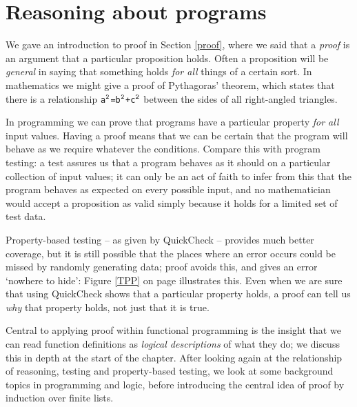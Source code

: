 
\chapter{Reasoning about programs}
\chapstart
\label{reasoningProgs}


We gave an introduction to proof in Section \ref{proof}, where we said
that a \emph{proof} is an argument that a particular proposition
holds. Often
a proposition will be \emph{general} in saying that something holds
\emph{for all} 
things of a certain sort. In mathematics we might give a proof of Pythagoras'
theorem, which states that there is a relationship {\tt a$^{\tt 2}$=b$^{\tt
2}$+c$^{\tt 2}$} between the sides of all right-angled triangles. 

In programming we can prove that programs have
a particular property \emph{for all} input values. Having a proof
means that we can be certain that the program will behave as we require
whatever the conditions. Compare this with program testing: a test
assures us that a program behaves as it should on a particular collection of input
values; it can only be an act of faith to infer from this that the program behaves as
expected on every possible input, and no mathematician would accept a proposition
as valid simply because it holds for a limited set of test data. 


Property-based testing -- as given by QuickCheck -- provides much better coverage, but it is still possible that the places where an error occurs could be missed by randomly generating data; proof avoids this, and gives an error `nowhere to hide': Figure \ref{TPP} on page \pageref{TPP} illustrates this. Even when we are sure that using QuickCheck shows that a particular property holds, a proof can tell us \emph{why} that property holds, not just that it is true.

Central to applying proof within functional programming is
the insight that we can read function definitions as \emph{logical
descriptions} of what they do; we discuss this in depth at the
start of the chapter. After looking again at the relationship of reasoning, testing and property-based testing, we look at some background topics in programming and logic,
before introducing the central idea of proof by induction over finite
lists.

